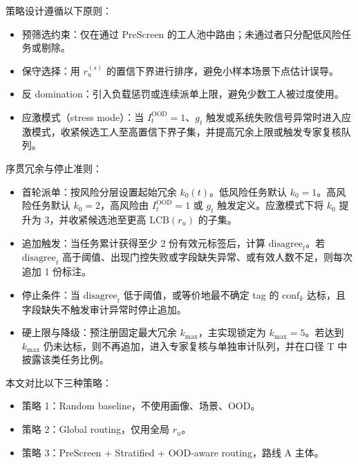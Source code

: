 策略设计遵循以下原则：
\begin{itemize}
    \item 预筛选约束：仅在通过 PreScreen 的工人池中路由；未通过者只分配低风险任务或剔除。
    \item 保守选择：用 $r_u^{\left(s\right)}$ 的置信下界进行排序，避免小样本场景下点估计误导。
    \item 反 domination：引入负载惩罚或连续派单上限，避免少数工人被过度使用。
    \item 应激模式（stress mode）：当 $I_t^{\mathrm{OOD}}=1$、$g_t$ 触发或系统失败信号异常时进入应激模式，收紧候选工人至高置信下界子集，并提高冗余上限或触发专家复核队列。
\end{itemize}
序贯冗余与停止准则：
\begin{itemize}
    \item 首轮派单：按风险分层设置起始冗余 $k_0\left(t\right)$。低风险任务默认 $k_0=1$。高风险任务默认 $k_0=2$，高风险由 $I_t^{\mathrm{OOD}}=1$ 或 $g_t$ 触发定义。应激模式下将 $k_0$ 提升为 3，并收紧候选池至更高 $\mathrm{LCB}(r_u)$ 的子集。
    \item 追加触发：当任务累计获得至少 2 份有效元标签后，计算 $\mathrm{disagree}_t$。若 $\mathrm{disagree}_t$ 高于阈值、出现门控失败或字段缺失异常、或有效人数不足，则每次追加 1 份标注。
    \item 停止条件：当 $\mathrm{disagree}_t$ 低于阈值，或等价地最不确定 tag 的 $\mathrm{conf}_k$ 达标，且字段缺失不触发审计异常时停止追加。
    \item 硬上限与降级：预注册固定最大冗余 $k_{\max}$，主实现锁定为 $k_{\max}=5$。若达到 $k_{\max}$ 仍未达标，则不再追加，进入专家复核与单独审计队列，并在口径 T 中披露该类任务比例。
\end{itemize}
本文对比以下三种策略：
\begin{itemize}
    \item 策略 1：Random baseline，不使用画像、场景、OOD。
    \item 策略 2：Global routing，仅用全局 $r_u$。
    \item 策略 3：PreScreen + Stratified + OOD-aware routing，路线 A 主体。
\end{itemize}

